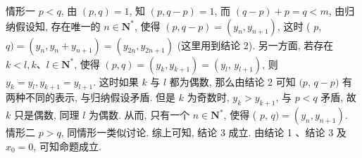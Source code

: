情形一 $p<q$, 由 $(p, q)=1$, 知 $(p, q-p)=1$, 而 $(q-p)+p=q< m$, 由归纳假设知, 存在唯一的 $n \in \mathbf{N}^*$, 使得 $(p, q-p)=\left(y_n, y_{n+1}\right)$, 这时 ( $p$, $q)=\left(y_n, y_n+y_{n+1}\right)=\left(y_{2 n}, y_{2 n+1}\right)$ (这里用到结论 2).
另一方面, 若存在 $k<l, k 、 l \in \mathbf{N}^*$, 使得 $(p, q)=\left(y_k, y_{k+1}\right)=\left(y_l\right.$, $\left.y_{l+1}\right)$, 则 $y_k=y_l, y_{k+1}=y_{l+1}$. 这时如果 $k$ 与 $l$ 都为偶数, 那么由结论 2 可知 $(p$, $q-p)$ 有两种不同的表示, 与归纳假设矛盾.
但是 $k$ 为奇数时, $y_k>y_{k+1}$, 与 $p<q$ 矛盾, 故 $k$ 只是偶数, 同理 $l$ 为偶数.
从而, 只有一个 $n \in \mathbf{N}^*$, 使得 ( $p$, $q)=\left(y_n, y_{n+1}\right)$.
情形二 $p>q$, 同情形一类似讨论.
综上可知, 结论 3 成立.
由结论 1 、结论 3 及 $x_0=0$, 可知命题成立.


